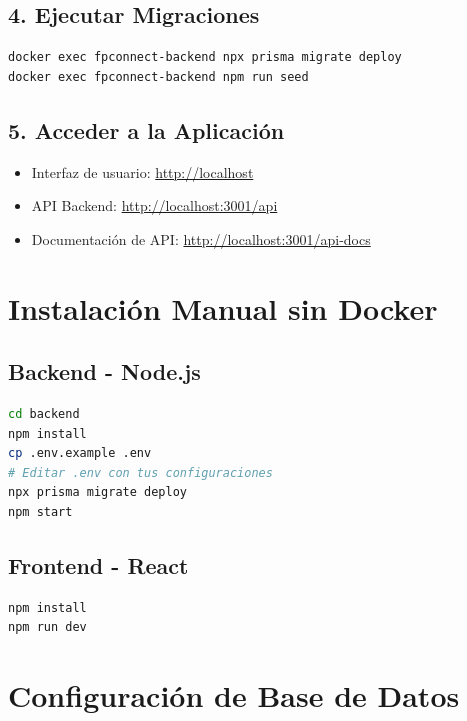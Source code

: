 \documentclass[a4paper]{report}
\begin{document}
\subsection{4. Ejecutar Migraciones}

\begin{lstlisting}[language=bash]
docker exec fpconnect-backend npx prisma migrate deploy
docker exec fpconnect-backend npm run seed
\end{lstlisting}

\subsection{5. Acceder a la Aplicación}

\begin{itemize}
  \item Interfaz de usuario: \url{http://localhost}
  \item API Backend: \url{http://localhost:3001/api}
  \item Documentación de API: \url{http://localhost:3001/api-docs}
\end{itemize}

\section{Instalación Manual sin Docker}

\subsection{Backend - Node.js}

\begin{lstlisting}[language=bash]
cd backend
npm install
cp .env.example .env
# Editar .env con tus configuraciones
npx prisma migrate deploy
npm start
\end{lstlisting}

\subsection{Frontend - React}

\begin{lstlisting}[language=bash]
npm install
npm run dev
\end{lstlisting}

\section{Configuración de Base de Datos}
\end{document}
